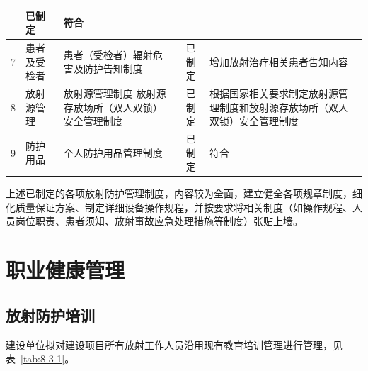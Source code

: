 \begin{longtable}{|c|m{1.7cm}|m{5.8cm}|c|m{4.1cm}|}
  & 已制定
  & \centering\arraybackslash 符合 \\
\hline
7 & \centering 患者及受检者
  & \centering 患者（受检者）辐射危害及防护告知制度
  & 已制定
  & 增加放射治疗相关患者告知内容 \\
\hline
8 & \centering 放射源管理
  & \centering 放射源管理制度\newline
    放射源存放场所（双人双锁）安全管理制度
  & 已制定
  & 根据国家相关要求制定放射源管理制度和放射源存放场所（双人双锁）安全管理制度 \\
\hline
9 & \centering 防护用品
  & \centering 个人防护用品管理制度
  & 已制定
  & \centering\arraybackslash 符合 \\
\hline
\end{longtable}


上述已制定的各项放射防护管理制度，内容较为全面，建立健全各项规章制度，细化质量保证方案、制定详细设备操作规程，并按要求将相关制度（如操作规程、人员岗位职责、患者须知、放射事故应急处理措施等制度）张贴上墙。

\section{职业健康管理}

\subsection{放射防护培训}

建设单位拟对建设项目所有放射工作人员沿用现有教育培训管理进行管理，见表~\ref{tab:8-3-1}。



